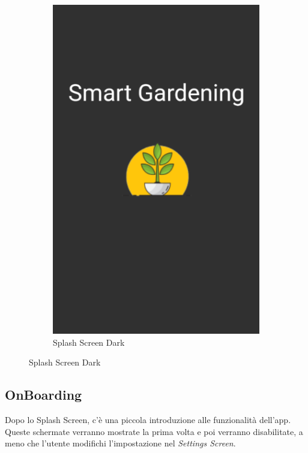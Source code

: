\documentclass[a4paper,12pt]{report}
\begin{document}
\begin{figure}[H]
\begin{subfigure}{0.3\textwidth}
	\includegraphics[width=\textwidth]{./images/splash/splash_screen_dark.png}
	\caption{Splash Screen Dark}
	\label{fig:splash_screen_dark}
\end{subfigure}

\end{figure}

\subsection{OnBoarding}

\textsf{\small Dopo lo Splash Screen, c'è una piccola introduzione alle funzionalità dell'app.}
\textsf{\small Queste schermate verranno mostrate la prima volta e poi verranno disabilitate, a meno che l'utente modifichi l'impostazione nel \emph{Settings Screen}.}
\end{document}
